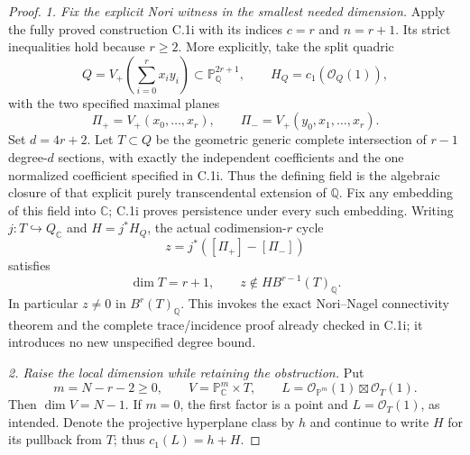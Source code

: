 \begin{proof}
\emph{1. Fix the explicit Nori witness in the smallest needed dimension.}
Apply the fully proved construction C.1i with its indices
$c=r$ and $n=r+1$. Its strict inequalities hold because
$r\ge2$. More explicitly, take the split quadric
\[
 Q=V_+\left(\sum_{i=0}^{r}x_i y_i\right)
           \subset\mathbb P^{2r+1}_{\mathbb Q},
 \qquad H_Q=c_1(\mathcal O_Q(1)),
\]
with the two specified maximal planes
\[
 \Pi_+=V_+(x_0,\ldots,x_r),\qquad
 \Pi_-=V_+(y_0,x_1,\ldots,x_r).
\]
Set $d=4r+2$. Let $T\subset Q$ be the geometric generic
complete intersection of $r-1$ degree-$d$ sections,
with exactly the independent coefficients and the one
normalized coefficient specified in C.1i. Thus the
defining field is the algebraic closure of that explicit
purely transcendental extension of $\mathbb Q$.
Fix any embedding of this field into $\mathbb C$;
C.1i proves persistence under every such embedding.
Writing $j:T\hookrightarrow Q_{\mathbb C}$ and
$H=j^*H_Q$, the actual codimension-$r$ cycle
\[
              z=j^*([\Pi_+]-[\Pi_-])
\]
satisfies
\begin{equation}\label{eq:C3aa-nori-witness}
    \dim T=r+1,\qquad
    z\notin H B^{r-1}(T)_{\mathbb Q}.
\end{equation}
In particular $z\ne0$ in $B^r(T)_{\mathbb Q}$.
This invokes the exact Nori--Nagel connectivity theorem
and the complete trace/incidence proof already checked
in C.1i; it introduces no new unspecified degree bound.

\emph{2. Raise the local dimension while retaining the obstruction.}
Put
\[
 m=N-r-2\ge0,\qquad V=\mathbb P^m_{\mathbb C}\times T,
 \qquad
 L=\mathcal O_{\mathbb P^m}(1)\boxtimes\mathcal O_T(1).
\]
Then $\dim V=N-1$. If $m=0$, the first factor is a point
and $L=\mathcal O_T(1)$, as intended. Denote the projective
hyperplane class by $h$ and continue to write $H$ for
its pullback from $T$; thus $c_1(L)=h+H$.


\end{proof}
